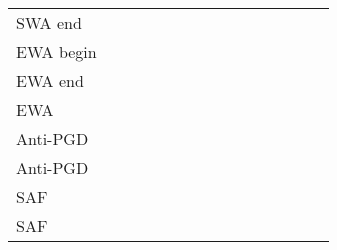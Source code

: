 \documentclass[runningheads]{llncs}
\begin{document}
\begin{table*}[!ht]
\begin{tabular}{l|r r r | r r r | r r r | r r | r r | r }
    SWA end       &  &  &  &  &  &  &  &  &  &  &  &  &  &  \\
    EWA begin     & &  & & &  & & &  & &  &  &  &  &   \\
    EWA end       & &  & & &  & & &  & &  &  &  &  &  \\
    EWA   & &  & & &  & &  &  &  &  &  &  &  &  \\
    Anti-PGD   &  &  &  &  &  &  &  &  &  &  &  &  &  &   \\
    Anti-PGD     & &  & &  &  &  &  &  &  &  &  &  &  &   \\
    SAF    &  &  &  &  &  &  &  &  &  &  &  &  &  &   \\
    SAF       &  &  &  &  &  &  &  &  &  &  &  &  &  &  \\
    \bottomrule
    \end{tabular}
\end{table*}
\end{document}
